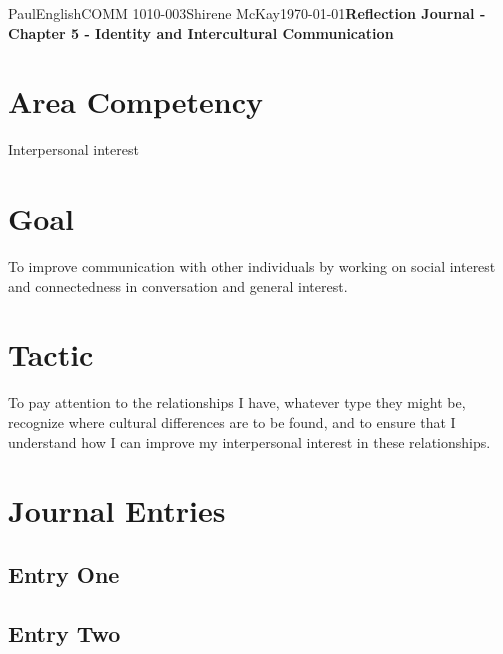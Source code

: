 \documentclass[12pt,letterpaper]{article}
\begin{document}
\begin{mla}{Paul}{English}{COMM 1010-003}{Shirene
    McKay}{\today}{\textbf{Reflection Journal - Chapter 5 - Identity and Intercultural Communication}}
    
\section{Area Competency}

Interpersonal interest 

\section{Goal}

To improve communication with other individuals by working on social interest and connectedness in conversation and general interest.

\section{Tactic}

To pay attention to the relationships I have, whatever type they might be, recognize where cultural differences are to be found, and to ensure that I understand how I can improve my interpersonal interest in these relationships.

\section{Journal Entries}

\subsection{Entry One}


\subsection{Entry Two}


\end{mla}
\end{document}
